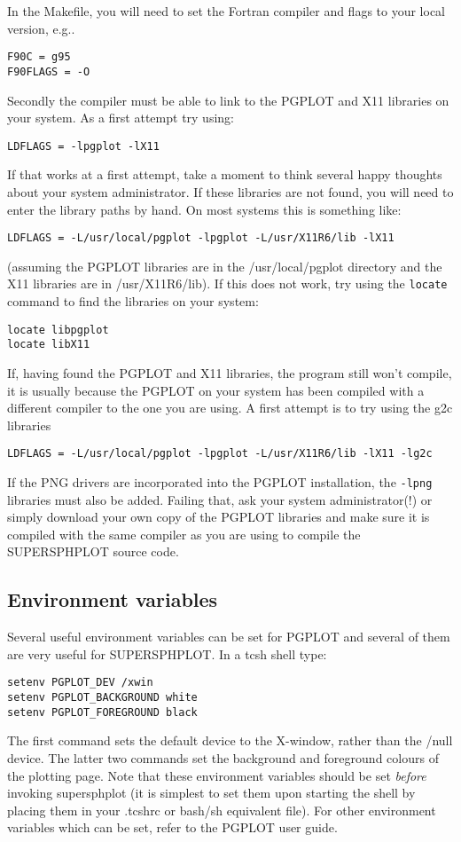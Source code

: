 \documentclass[a4paper,12pt]{article}
\begin{document}
 In the Makefile, you will need to set the Fortran compiler and flags to your local version, e.g..
\begin{verbatim}
F90C = g95
F90FLAGS = -O
\end{verbatim}
 Secondly the compiler must be able to link to the PGPLOT and X11 libraries on
your system. As a first attempt try using:
\begin{verbatim}
LDFLAGS = -lpgplot -lX11
\end{verbatim}
If that works at a first attempt, take a moment to think several happy thoughts about your system
administrator. If these libraries are not found, you will need to enter the
library paths by hand. On most systems this is something like:
\begin{verbatim}
LDFLAGS = -L/usr/local/pgplot -lpgplot -L/usr/X11R6/lib -lX11
\end{verbatim}
(assuming the PGPLOT libraries are in the /usr/local/pgplot directory and the
X11 libraries are in /usr/X11R6/lib). If this does not work, try using the
\verb+locate+ command to find the libraries on your system:
\begin{verbatim}
locate libpgplot
locate libX11
\end{verbatim}
 If, having found the PGPLOT and X11
libraries, the program still won't compile, it is usually
because the PGPLOT on your system has been compiled with a different compiler to
the one you are using. A first attempt is to try using the g2c libraries
\begin{verbatim}
LDFLAGS = -L/usr/local/pgplot -lpgplot -L/usr/X11R6/lib -lX11 -lg2c
\end{verbatim}
If the PNG drivers are incorporated into the PGPLOT installation, the \verb+-lpng+ libraries must also be added.
Failing that, ask your system administrator(!) or simply download your own copy of
the PGPLOT libraries and make sure it is compiled with the same compiler as you
are using to compile the SUPERSPHPLOT source code.

\subsection{Environment variables}
 Several useful environment variables can be set for PGPLOT and several of them
are very useful for SUPERSPHPLOT. In a tcsh shell type:
\begin{verbatim}
setenv PGPLOT_DEV /xwin
setenv PGPLOT_BACKGROUND white
setenv PGPLOT_FOREGROUND black
\end{verbatim}
The first command sets the default device to the X-window, rather than the /null
device. The latter two commands set the background and foreground colours of the
plotting page. Note that these environment variables should be set \emph{before}
invoking supersphplot (it is simplest to set them upon starting the shell by placing
them in your .tcshrc or bash/sh equivalent file). For other environment
variables which can be set, refer to the PGPLOT user guide.
\end{document}

